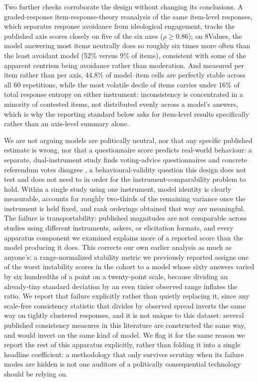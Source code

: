 \documentclass[11pt]{article}
\begin{document}
Two further checks corroborate the design without changing its
conclusions. A graded-response item-response-theory reanalysis of the same
item-level responses, which separates response avoidance from ideological
engagement, tracks the published axis scores closely on five of the six
axes ($\rho \geq 0.86$); on 8Values, the model answering most items
neutrally does so roughly six times more often than the least avoidant
model (52\% versus 9\% of items), consistent with some of the apparent
centrism being avoidance rather than moderation. And measured per item
rather than per axis, 44.8\% of model--item cells are perfectly stable
across all 60 repetitions, while the most volatile decile of items carries
under 16\% of total response entropy on either instrument: inconsistency is
concentrated in a minority of contested items, not distributed evenly
across a model's answers, which is why the reporting standard below asks
for item-level results specifically rather than an axis-level summary
alone.

We are not arguing models are politically neutral, nor that any specific
published estimate is wrong, nor that a questionnaire score predicts
real-world behaviour: a separate, dual-instrument study finds voting-advice
questionnaires and concrete referendum votes disagree
\citep{barmettler2026instrument}, a behavioural-validity question this
design does not test and does not need to in order for the
instrument-comparability problem to hold. Within a single study using one
instrument, model identity is clearly measurable, accounts for roughly
two-thirds of the remaining variance once the instrument is held fixed, and
rank orderings obtained that way are meaningful. The failure is
transportability: published magnitudes are not comparable across studies
using different instruments, askers, or elicitation formats, and every
apparatus component we examined explains more of a reported score than the
model producing it does. This corrects our own earlier analysis as much as
anyone's: a range-normalized stability metric we previously reported
assigns one of the worst instability scores in the cohort to a model whose
sixty answers varied by six hundredths of a point on a twenty-point scale,
because dividing an already-tiny standard deviation by an even tinier
observed range inflates the ratio. We report that failure explicitly rather
than quietly replacing it, since any scale-free consistency statistic that
divides by observed spread inverts the same way on tightly clustered
responses, and it is not unique to this dataset: several published
consistency measures in this literature are constructed the same way, and
would invert on the same kind of model. We flag it for the same reason we
report the rest of this apparatus explicitly, rather than folding it into a
single headline coefficient: a methodology that only survives scrutiny when
its failure modes are hidden is not one auditors of a politically
consequential technology should be relying on.
\end{document}
